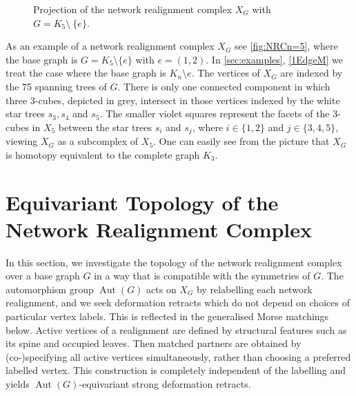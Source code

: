 \documentclass[reqno,dvipsnames]{amsart}
\theoremstyle{plain}
\numberwithin{equation}{section}
\theoremstyle{definition}
\DeclareMathOperator{\Aut}{Aut}
\begin{document}
\begin{figure}[t]
	\caption{Projection of the network realignment complex  $X_G$ with $G=K_5\setminus~\{e\}$.}
	\label{fig:NRCn=5}
\end{figure}

As an example of a network realignment complex $X_G$ see \autoref{fig:NRCn=5}, where the base graph is $G=K_5\setminus \{e\}$ with $e=(1,2)$. In \autoref{sec:examples}, \autoref{1EdgeM} we treat the case where the base graph is $K_n\setminus e$. The vertices of $X_G$ are indexed by the 75 spanning trees of $G$. There is only one connected component in which three 3-cubes, depicted in grey, intersect in those vertices indexed by the white star trees $s_3,s_4$ and $s_5$. The smaller violet squares represent the facets of the 3-cubes in $X_5$ between the star trees $s_i$ and $s_j$, where $i\in\{1,2\}$ and $j\in\{3,4,5\}$, viewing $X_G$ as a subcomplex of $X_5$. One can easily see from the picture that $X_G$ is homotopy equivalent to the complete graph $K_3$.
		
\section{Equivariant Topology of the Network Realignment Complex}\label{TopoChapter}

In this section, we investigate the topology of the network realignment complex over a base graph $G$ in a way that is compatible with the symmetries of $G$. The automorphism group $\Aut(G)$ acts on $X_G$ by relabelling each network realignment, and we seek deformation retracts which do not depend on choices of particular vertex labels. This is reflected in the generalised Morse matchings below. Active vertices of a realignment are defined by structural features such as its spine and occupied leaves. Then matched partners are obtained by (co-)specifying all active vertices simultaneously, rather than choosing a preferred labelled vertex. This construction is completely independent of the labelling and yields $\Aut(G)$-equivariant strong deformation retracts.
\end{document}
